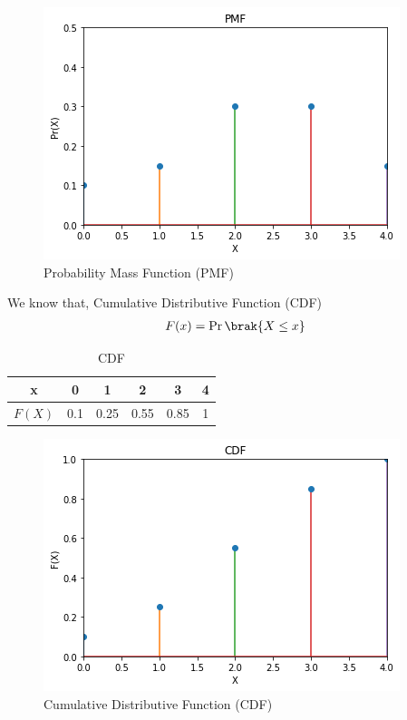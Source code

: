 \begin{figure}[ht]
    \centering
    \includegraphics[width=\columnwidth]{solutions/5/28/Figures/PMF.png}
    \caption{Probability Mass Function (PMF)}
    \label{Figure_1}
\end{figure}

We know that, Cumulative Distributive Function (CDF) 
\begin{align}
    F(x) = \Pr\brak{X \le x}
\end{align}

\begin{table}[ht]
  
  \centering
  \begin{tabular}{|c|c|c|c|c|c|}
    \hline
    x &  0 & 1 & 2 & 3 & 4\\
    \hline
    $F(X)$ & 0.1& 0.25& 0.55 & 0.85 & 1\\
    \hline
    
\end{tabular} 
\caption{CDF}
\label{Table_2}
\end{table}

\begin{figure}[ht]
    \centering
    \includegraphics[width=\columnwidth]{solutions/5/28/Figures/CDF.png}
    \caption{Cumulative Distributive Function (CDF)}
    \label{Figure_2}
\end{figure}

